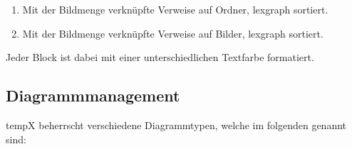 \begin{description}
\begin{enumerate}
				\item Mit der Bildmenge verknüpfte Verweise auf Ordner, \gls{lexgraph} sortiert.
				
				\item Mit der Bildmenge verknüpfte Verweise auf Bilder, \gls{lexgraph} sortiert.
				
			\end{enumerate}
			
			Jeder Block ist dabei mit einer unterschiedlichen Textfarbe formatiert.
		
	\end{description}

\subsection{Diagrammmanagement}

\label{subsec:diagrammmgmt}

	\gls{tempX} beherrscht verschiedene Diagrammtypen, welche im folgenden genannt sind:
	
